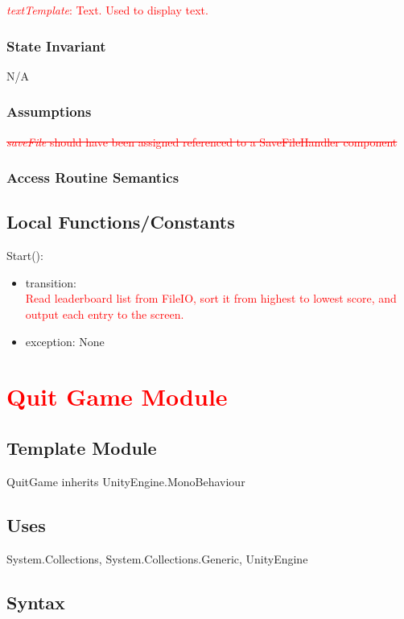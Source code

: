 \documentclass[12pt]{article}
\begin{document}
\noindent\textcolor{red}{\textit{textTemplate}: Text. Used to display text.} 

\subsubsection {State Invariant}
N/A
\subsubsection {Assumptions}
\textcolor{red}{\sout{\textit{saveFile} should have been assigned referenced to a SaveFileHandler component}}
\subsubsection {Access Routine Semantics}

\subsection{Local Functions/Constants}
\noindent Start():
\begin{itemize}
	\item transition: \\
	\textcolor{red}{Read leaderboard list from FileIO, sort it from highest to lowest score, and output each entry to the screen.}
	\item exception: None
\end{itemize}

\newpage
\section{\textcolor{red}{Quit Game Module}}

\subsection{Template Module}
QuitGame inherits UnityEngine.MonoBehaviour

\subsection {Uses}
System.Collections, System.Collections.Generic, UnityEngine

\subsection {Syntax}
\end{document}
